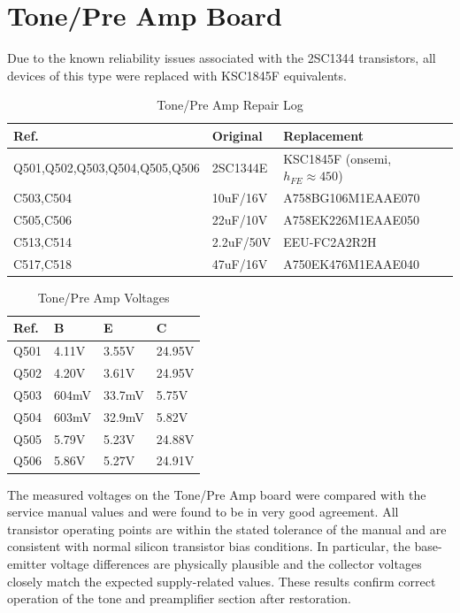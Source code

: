 \documentclass[]{article}
\begin{document}
\section{Tone/Pre Amp Board}

Due to the known reliability issues associated with the 2SC1344 transistors, all devices of this type were replaced with KSC1845F equivalents.

\begin{table}[H]
	\centering
	\caption{Tone/Pre Amp Repair Log}
	\label{tab:tone_amp_log}
	\begin{tabular}{|l|l|l|}
		\hline
		\textbf{Ref.} & \textbf{Original} & \textbf{Replacement} \\
		\hline
		Q501,Q502,Q503,Q504,Q505,Q506 & 2SC1344E & KSC1845F (onsemi, $h_{FE} \approx 450$) \\
        \hline
        C503,C504 & 10uF/16V & A758BG106M1EAAE070 \\
        \hline
        C505,C506 & 22uF/10V & A758EK226M1EAAE050 \\
        \hline
        C513,C514 & 2.2uF/50V & EEU-FC2A2R2H \\
        \hline
        C517,C518 & 47uF/16V & A750EK476M1EAAE040 \\
        \hline
	\end{tabular}
\end{table}

\begin{table}[H]
	\centering
	\caption{Tone/Pre Amp Voltages}
	\label{tab:tone_amp_voltages}
	\begin{tabular}{|l|l|l|l|}
    \hline
 \textbf{Ref.} & \textbf{B} & \textbf{E} & \textbf{C} \\
    \hline
    Q501 & 4.11V  &   3.55V & 24.95V  \\
    \hline
    Q502 & 4.20V  &   3.61V  & 24.95V \\
    \hline
    Q503 & 604mV  &  33.7mV & 5.75V  \\
    \hline
    Q504 & 603mV  &  32.9mV & 5.82V \\
    \hline
    Q505 & 5.79V   & 5.23V & 24.88V \\
    \hline
    Q506 & 5.86V  &  5.27V & 24.91V \\
    \hline
	\end{tabular}
\end{table}

The measured voltages on the Tone/Pre Amp board were compared with the service manual values and were found to be in very good agreement. All transistor operating points are within the stated tolerance of the manual and are consistent with normal silicon transistor bias conditions. In particular, the base-emitter voltage differences are physically plausible and the collector voltages closely match the expected supply-related values. These results confirm correct operation of the tone and preamplifier section after restoration.
\end{document}
